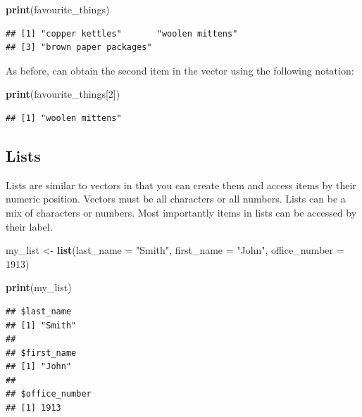 \documentclass[
]{krantz}
\makeatletter
\newenvironment{Shaded}{\begin{snugshade}}{\end{snugshade}}
\newcommand{\DataTypeTok}[1]{\textcolor[rgb]{0.27,0.27,0.27}{#1}}
\newcommand{\DecValTok}[1]{\textcolor[rgb]{0.06,0.06,0.06}{#1}}
\newcommand{\KeywordTok}[1]{\textcolor[rgb]{0.27,0.27,0.27}{\textbf{#1}}}
\newcommand{\NormalTok}[1]{#1}
\newcommand{\StringTok}[1]{\textcolor[rgb]{0.5,0.5,0.5}{#1}}
\newenvironment{kframe}{%
\medskip{}
\setlength{\fboxsep}{.8em}
 \def\at@end@of@kframe{}%
 \ifinner\ifhmode%
  \def\at@end@of@kframe{\end{minipage}}%
  \begin{minipage}{\columnwidth}%
 \fi\fi%
 \def\FrameCommand##1{\hskip\@totalleftmargin \hskip-\fboxsep
 \colorbox{shadecolor}{##1}\hskip-\fboxsep
     \hskip-\linewidth \hskip-\@totalleftmargin \hskip\columnwidth}%
 \MakeFramed {\advance\hsize-\width
   \@totalleftmargin\z@ \linewidth\hsize
   \@setminipage}}%
 {\par\unskip\endMakeFramed%
 \at@end@of@kframe}
\renewenvironment{Shaded}{\begin{kframe}}{\end{kframe}}
\makeatother
\begin{document}
\begin{Shaded}
\begin{Highlighting}[]
\KeywordTok{print}\NormalTok{(favourite_things)}
\end{Highlighting}
\end{Shaded}

\begin{verbatim}
## [1] "copper kettles"       "woolen mittens"      
## [3] "brown paper packages"
\end{verbatim}

As before, can obtain the second item in the vector using the following notation:

\begin{Shaded}
\begin{Highlighting}[]
\KeywordTok{print}\NormalTok{(favourite_things[}\DecValTok{2}\NormalTok{])}
\end{Highlighting}
\end{Shaded}

\begin{verbatim}
## [1] "woolen mittens"
\end{verbatim}

\hypertarget{lists}{%
\subsection{Lists}\label{lists}}

Lists are similar to vectors in that you can create them and access items by their numeric position. Vectors must be all characters or all numbers. Lists can be a mix of characters or numbers. Most importantly items in lists can be accessed by their label.

\begin{Shaded}
\begin{Highlighting}[]
\NormalTok{my_list <-}\StringTok{ }\KeywordTok{list}\NormalTok{(}\DataTypeTok{last_name =} \StringTok{"Smith"}\NormalTok{,}
                \DataTypeTok{first_name =} \StringTok{"John"}\NormalTok{,}
                \DataTypeTok{office_number =} \DecValTok{1913}\NormalTok{)}

\KeywordTok{print}\NormalTok{(my_list)}
\end{Highlighting}
\end{Shaded}

\begin{verbatim}
## $last_name
## [1] "Smith"
## 
## $first_name
## [1] "John"
## 
## $office_number
## [1] 1913
\end{verbatim}
\end{document}
